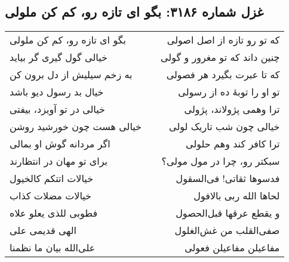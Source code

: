 \begin{center}
\section*{غزل شماره ۳۱۸۶: بگو ای تازه رو، کم کن ملولی}
\label{sec:3186}
\begin{longtable}{l p{0.5cm} r}
بگو ای تازه رو، کم کن ملولی
&&
که تو رو تازه از اصل اصولی
\\
خیالی گول گیری گر بیاید
&&
چنین داند که تو مغرور و گولی
\\
به زخم سیلیش از دل برون کن
&&
که تا عبرت بگیرد هر فصولی
\\
خیال بد رسول دیو باشد
&&
تو او را توبهٔ ده از رسولی
\\
خیالی در تو آویزد، بیفتی
&&
ترا وهمی پژولاند، پژولی
\\
خیالی هست چون خورشید روشن
&&
خیالی چون شب تاریک لولی
\\
اگر مردانه گوش او بمالی
&&
ترا کافر کند وهم حلولی
\\
برای تو مهان در انتظارند
&&
سبکتر رو، چرا در مول مولی؟
\\
خیالات اتتکم کالخیول
&&
فدسوها ثقاتی! فی‌السقول
\\
خیالات مضلات کذاب
&&
لحاها الله ربی بالافول
\\
فطوبی للذی یعلو علاه
&&
و یقطع عرقها قبل‌الحصول
\\
الهی قدیمی علی
&&
صفی‌القلب من غش‌الغلول
\\
علی‌الله بیان ما نظمنا
&&
مفاعیلن مفاعیلن فعولی
\\
\end{longtable}
\end{center}
